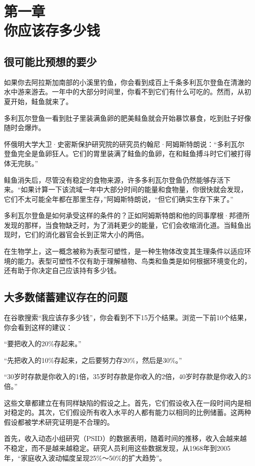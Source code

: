 \section[第一章\q 你应该存多少钱]{第一章\\ 你应该存多少钱}
\renewcommand{\bookchapter}{1}
\setcounter{figure}{0}
\setcounter{table}{0}
\subsection{很可能比预想的要少}
如果你去阿拉斯加南部的小溪里钓鱼，你会看到成百上千条多利瓦尔登鱼在清澈的水中游来游去。一年中的大部分时间里，你看不到它们有什么可吃的。然而，从初夏开始，鲑鱼就来了。

多利瓦尔登鱼一看到肚子里装满鱼卵的肥美鲑鱼就会开始暴饮暴食，吃到肚子好像随时会爆炸。

怀俄明大学大卫·史密斯保护研究院的研究员约翰尼·阿姆斯特朗说：“多利瓦尔登鱼完全是鱼卵狂人。它们的胃里装满了鲑鱼的鱼卵，在和鲑鱼搏斗时它们被打得体无完肤。”

鲑鱼消失后，尽管没有稳定的食物来源，许多多利瓦尔登鱼仍然能够存活下来。“如果计算一下该流域一年中大部分时间的能量和食物量，你很快就会发现，它们不太可能全年都在那里生存，”阿姆斯特朗说，“但它们确实生存下来了。”

多利瓦尔登鱼是如何承受这样的条件的？正如阿姆斯特朗和他的同事摩根·邦德所发现的那样，当食物缺乏时，为了消耗更少的能量，它们会收缩消化道。当鲑鱼出现时，它们的消化器官会长到正常大小的两倍。

在生物学上，这一概念被称为表型可塑性，是一种生物体改变其生理条件以适应环境的能力。表型可塑性不仅有助于理解植物、鸟类和鱼类是如何根据环境变化的，还有助于你决定自己应该持有多少钱。

\subsection{大多数储蓄建议存在的问题}
在谷歌搜索“我应该存多少钱”，你会看到不下15万个结果。浏览一下前10个结果，你会看到这样的建议：

“要把收入的20\%存起来。”

“先把收入的10\%存起来，之后要努力存20\%，然后是30\%。”

“30岁时存款是你收入的1倍，35岁时存款是你收入的2倍，40岁时存款是你收入的3倍。”

这些文章都建立在有同样缺陷的假设之上。首先，它们假设收入在一段时间内是相对稳定的。其次，它们假设所有收入水平的人都有能力以相同的比例储蓄。这两种假设都被学术研究证明是不合理的。

首先，收入动态小组研究（PSID）的数据表明，随着时间的推移，收入会越来越不稳定，而不是越来越稳定。研究人员利用这些数据发现，从1968年到2005年，“家庭收入波动幅度呈现25\%～50\%的扩大趋势”。

